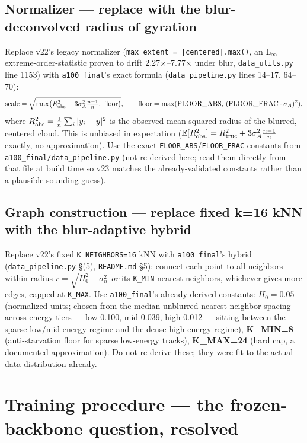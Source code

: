 \documentclass[11pt]{article}
\newcommand{\code}[1]{\texttt{#1}}
\begin{document}
\subsection{Normalizer --- replace with the blur-deconvolved radius of gyration}
\label{sec:normalizer}
Replace v22's legacy normalizer (\code{max\_extent = |centered|.max()}, an L$_\infty$
extreme-order-statistic proven to drift 2.27$\times$--7.77$\times$ under blur,
\code{data\_utils.py} line 1153) with \code{a100\_final}'s exact formula
(\code{data\_pipeline.py} lines 14--17, 64--70):
\[
  \text{scale} = \sqrt{\max\!\big(R^2_{\rm obs} - 3\sigma_A^2\tfrac{n-1}{n},\ \text{floor}\big)},
  \qquad \text{floor} = \max(\text{FLOOR\_ABS},\, (\text{FLOOR\_FRAC}\cdot\sigma_A)^2),
\]
where $R^2_{\rm obs} = \tfrac{1}{n}\sum_i |y_i-\bar y|^2$ is the observed mean-squared radius
of the blurred, centered cloud. This is unbiased in expectation
($\mathbb{E}[R^2_{\rm obs}] = R^2_{\rm true} + 3\sigma_A^2\tfrac{n-1}{n}$ exactly, no
approximation). Use the exact \code{FLOOR\_ABS}/\code{FLOOR\_FRAC} constants from
\code{a100\_final/data\_pipeline.py} (not re-derived here; read them directly from that file
at build time so v23 matches the already-validated constants rather than a plausible-sounding
guess).

\subsection{Graph construction --- replace fixed k=16 kNN with the blur-adaptive hybrid}
\label{sec:graph}
Replace v22's fixed \code{K\_NEIGHBORS=16} kNN with \code{a100\_final}'s hybrid
(\code{data\_pipeline.py} \S(5), \code{README.md} \S5): connect each point to all neighbors
within radius $r=\sqrt{H_0^2+\sigma_n^2}$ \emph{or} its \code{K\_MIN} nearest neighbors,
whichever gives more edges, capped at \code{K\_MAX}. Use \code{a100\_final}'s already-derived
constants: \textbf{$H_0=0.05$} (normalized units; chosen from the median unblurred
nearest-neighbor spacing across energy tiers --- low 0.100, mid 0.039, high 0.012 --- sitting
between the sparse low/mid-energy regime and the dense high-energy regime),
\textbf{K\_MIN=8} (anti-starvation floor for sparse low-energy tracks), \textbf{K\_MAX=24}
(hard cap, a documented approximation). Do not re-derive these; they were fit to the actual
data distribution already.

\section{Training procedure --- the frozen-backbone question, resolved}
\label{sec:training}
\end{document}
